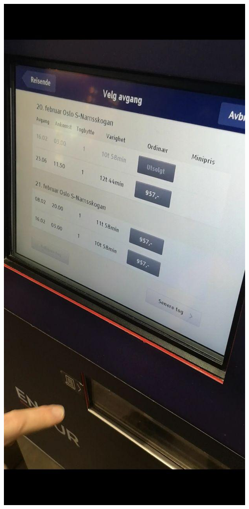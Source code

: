\documentclass{../../myassignment}
\begin{document}
	\includegraphics[scale=0.25]{pictures2/departureprices.jpg}
\end{document}
